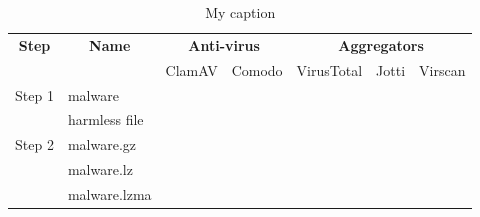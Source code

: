 \documentclass{article}           %
\title{}     %
\author{}        %
\begin{document}

\begin{table}[]
\centering
\caption{My caption}
\label{my-label}
\begin{tabular}{lllccccc}
\hline
\multicolumn{1}{|c|}{\multirow{2}{*}{\textbf{Step}}} & \multicolumn{2}{c|}{\multirow{2}{*}{\textbf{Name}}}                     & \multicolumn{2}{c|}{\textbf{Anti-virus}}                  & \multicolumn{3}{c|}{\textbf{Aggregators}}                                                   \\ \cline{4-8} 
\multicolumn{1}{|c|}{}                               & \multicolumn{2}{c|}{}                                                   & \multicolumn{1}{c|}{ClamAV} & \multicolumn{1}{c|}{Comodo} & \multicolumn{1}{c|}{VirusTotal} & \multicolumn{1}{c|}{Jotti} & \multicolumn{1}{c|}{Virscan} \\ \hline
\multicolumn{1}{|l|}{\multirow{2}{*}{Step 1}}        & \multicolumn{2}{l|}{malware}                                            & \multicolumn{1}{c|}{}       & \multicolumn{1}{c|}{}       & \multicolumn{1}{c|}{}           & \multicolumn{1}{c|}{}      & \multicolumn{1}{c|}{}        \\ \cline{2-8} 
\multicolumn{1}{|l|}{}                               & \multicolumn{2}{l|}{harmless file}                                      & \multicolumn{1}{c|}{}       & \multicolumn{1}{c|}{}       & \multicolumn{1}{c|}{}           & \multicolumn{1}{c|}{}      & \multicolumn{1}{c|}{}        \\ \hline
\multicolumn{1}{|l|}{\multirow{8}{*}{Step 2}}        & \multicolumn{2}{l|}{malware.gz}                                         & \multicolumn{1}{c|}{}       & \multicolumn{1}{c|}{}       & \multicolumn{1}{c|}{}           & \multicolumn{1}{c|}{}      & \multicolumn{1}{c|}{}        \\ \cline{2-8} 
\multicolumn{1}{|l|}{}                               & \multicolumn{2}{l|}{malware.lz}                                         & \multicolumn{1}{c|}{}       & \multicolumn{1}{c|}{}       & \multicolumn{1}{c|}{}           & \multicolumn{1}{c|}{}      & \multicolumn{1}{c|}{}        \\ \cline{2-8} 
\multicolumn{1}{|l|}{}                               & \multicolumn{2}{l|}{malware.lzma}                                       & \multicolumn{1}{c|}{}       & \multicolumn{1}{c|}{}       & \multicolumn{1}{c|}{}           & \multicolumn{1}{c|}{}      & \multicolumn{1}{c|}{}        \\ \cline{2-8} 

\end{tabular}
\end{table}
\end{document}
